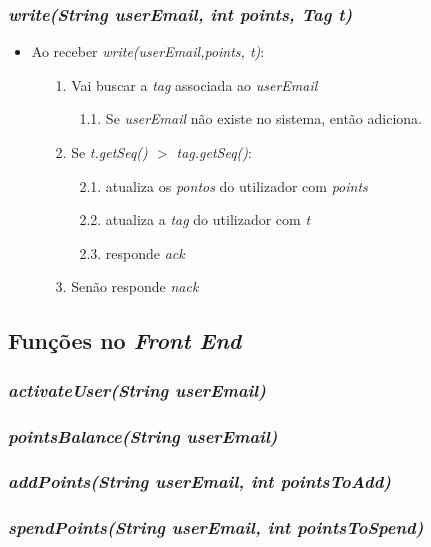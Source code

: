 \documentclass[a4paper]{article}
\begin{document}
\subsubsection{\textit{write(String userEmail, int points, Tag t)}}
\begin{itemize}
\item Ao receber \textit{write(userEmail,points, t)}:
\begin{itemize}
\item[1.] Vai buscar a \textit{tag} associada ao \textit{userEmail}
\begin{itemize}
\item[1.1.] Se \textit{userEmail} não existe no sistema, então adiciona.
\end{itemize}
\item[2.] Se \textit{t.getSeq() $>$ tag.getSeq()}:
\begin{itemize}
\item[2.1.] atualiza os \textit{pontos} do utilizador com \textit{points}
\item[2.2.] atualiza a \textit{tag} do utilizador com \textit{t}
\item[2.3.] responde \textit{ack}
\end{itemize}
\item[3.] Senão responde \textit{nack}
\end{itemize}
\end{itemize}
\subsection{Funções no \textit{Front End}}
\subsubsection{\textit{activateUser(String userEmail)}}
\subsubsection{\textit{pointsBalance(String userEmail)}}
\subsubsection{\textit{addPoints(String userEmail, int pointsToAdd)}}
\subsubsection{\textit{spendPoints(String userEmail, int pointsToSpend)}}
\end{document}
